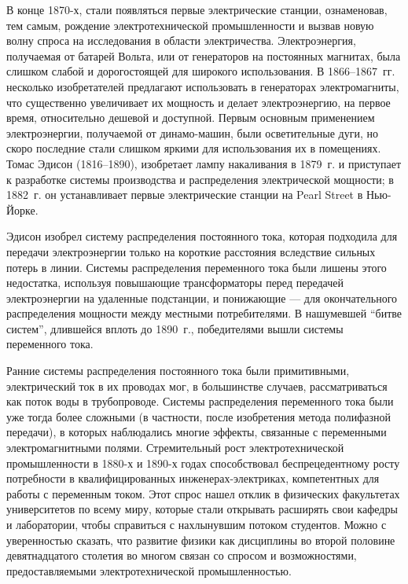\documentclass[12pt, oneside, a4paper]{article}
\begin{document}
В конце 1870-х, стали появляться первые электрические станции, ознаменовав, тем самым, рождение электротехнической промышленности и вызвав новую волну спроса на исследования в области электричества. Электроэнергия, получаемая от батарей Вольта, или от генераторов на постоянных магнитах, была слишком слабой и дорогостоящей для широкого использования. В 1866--1867~гг. несколько изобретателей предлагают использовать в генераторах электромагниты, что существенно увеличивает их мощность и делает электроэнергию, на первое время, относительно дешевой и доступной. Первым основным применением электроэнергии, получаемой от динамо-машин, были осветительные дуги, но скоро последние стали слишком яркими для использования их в помещениях. Томас Эдисон (1816--1890), изобретает лампу накаливания в 1879~г. и приступает к разработке системы производства и распределения электрической мощности; в 1882~г. он устанавливает первые электрические станции на Pearl Street в Нью-Йорке.

Эдисон изобрел систему распределения постоянного тока, которая подходила для передачи электроэнергии только на короткие расстояния вследствие сильных потерь в линии. Системы распределения переменного тока были лишены этого недостатка, используя повышающие трансформаторы перед передачей электроэнергии на удаленные подстанции, и понижающие --- для окончательного распределения мощности между местными потребителями. В нашумевшей ``битве систем'', длившейся вплоть до 1890~г., победителями вышли системы переменного тока.

Ранние системы распределения постоянного тока были примитивными, электрический ток в их проводах мог, в большинстве случаев, рассматриваться как поток воды в трубопроводе. Системы распределения переменного тока были уже тогда более сложными (в частности, после изобретения метода полифазной передачи), в которых наблюдались многие эффекты, связанные с переменными электромагнитными полями. Стремительный рост электротехнической промышленности в 1880-х и 1890-х годах способствовал беспрецедентному росту потребности в квалифицированных инженерах-электриках, компетентных для работы с переменным током. Этот спрос нашел отклик в физических факультетах университетов по всему миру, которые стали открывать расширять свои кафедры и лаборатории, чтобы справиться с нахлынувшим потоком студентов. Можно с уверенностью сказать, что развитие физики как дисциплины во второй половине девятнадцатого столетия во многом связан со спросом и возможностями, предоставляемыми электротехнической промышленностью. 
\end{document}
